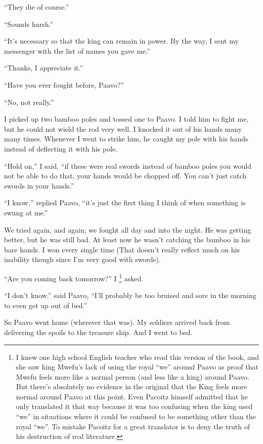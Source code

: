 ``They die of course.''

``Sounds harsh.''

``It's necessary so that the king can remain in power. By the way, I sent my messenger with the list of names you gave me.''

``Thanks, I appreciate it.''

``Have you ever fought before, Paavo?''

``No, not really.''

I picked up two bamboo poles and tossed one to Paavo. I told him to fight me, but he could not wield the rod very well. I knocked it out of his hands many many times. Whenever I went to strike him, he caught my pole with his hands instead of deflecting it with his pole.

``Hold on,'' I said, ``if these were real swords instead of bamboo poles you would not be able to do that, your hands would be chopped off. You can't just catch swords in your hands.''

``I know,'' replied Paavo, ``it's just the first thing I think of when something is swung at me.''

We tried again, and again; we fought all day and into the night. He was getting better, but he was still bad. At least now he wasn't catching the bamboo in his bare hands. I won every single time (That doesn't really reflect much on his inability though since I'm very good with swords).

``Are you coming back tomorrow?'' I
\footnote{I knew one high school English teacher who read this version of the book, and she saw king Mwefu's lack of using the royal ``we'' around Paavo as proof that Mwefu feels more like a normal person (and less like a king) around Paavo.
But there's absolutely no evidence in the original that the King feels more normal around Paavo at this point. 
Even Pacoitz himself admitted that he only translated it that way because it was too confusing when the king used ``we'' in situations where it could be confused to be something other than the royal ``we''. To mistake Pacoitz for a great translator is to deny the truth of his destruction of real literature.
} asked.

``I don't know.'' said Paavo, ``I'll probably be too bruised and sore in the morning to even get up out of bed.''

So Paavo went home (wherever that was). My soldiers arrived back from delivering the spoils to the treasure ship. And I went to bed.
